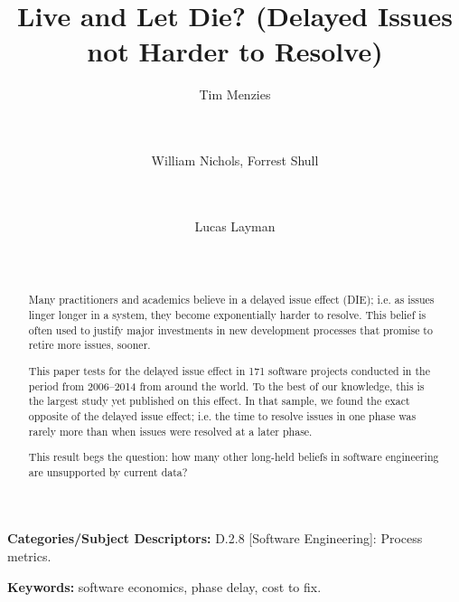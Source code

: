 \documentclass{sig-alternate}
\begin{document}
\title{Live and Let Die? (Delayed Issues   not  Harder to Resolve)}
\author{
Tim Menzies \\
       \\
       \\
\and%
William Nichols, Forrest Shull \\
        \\
        \\
\and %
Lucas Layman \\
        \\
       \\ 
} 
\maketitle
\begin{abstract}
Many  practitioners and academics
believe in a delayed issue effect (DIE); i.e.
 as issues linger longer in a system,
 they become exponentially harder to resolve.
This belief
is often  used to justify 
major investments in  new development
processes that promise to retire more issues, sooner.

This paper tests for the delayed issue effect in
171 software projects conducted in the period from 2006--2014 from around the world.
To the best of our knowledge,  this is the largest study
yet published on this effect.
In that sample, we found the exact
opposite of the  delayed issue effect; i.e.
the  time  to resolve 
issues  in one phase  was rarely more than when  issues
were resolved at a later phase. 

This  result begs the question: how many other long-held
beliefs in software engineering are
unsupported by current data? 
\end{abstract}

\vspace{1mm}
\noindent
{\bf Categories/Subject Descriptors:} 
D.2.8 [Software Engineering]: Process metrics.

 

\vspace{1mm}
\noindent
{\bf Keywords:} software economics, phase delay, cost to fix.
 
\end{document}
